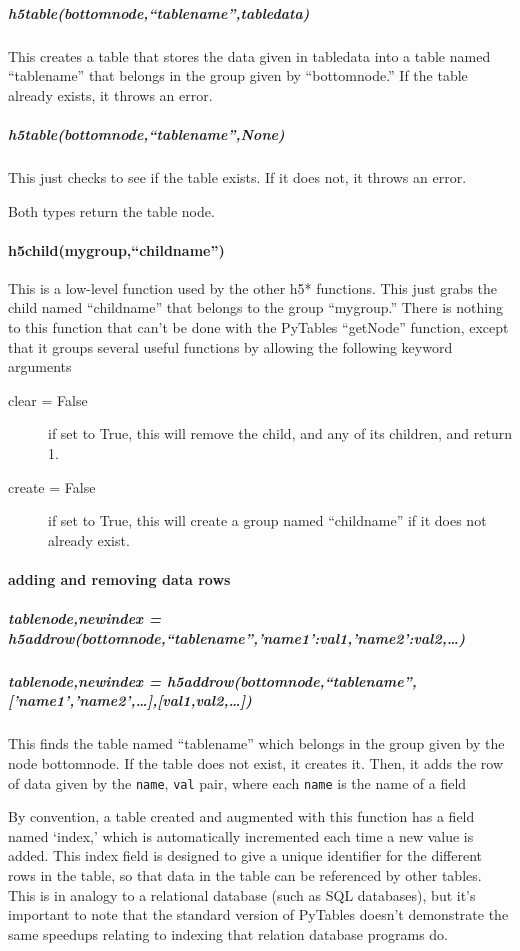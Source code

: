 \subparagraph{h5table(bottomnode,``tablename'',tabledata)}
This creates a table that stores the data given in tabledata
    into a table named ``tablename'' that belongs in the group given
    by ``bottomnode.''
If the table already exists, it throws an error.

\subparagraph{h5table(bottomnode,``tablename'',None)}
This just checks to see if the table exists.
If it does not, it throws an error.

Both types return the table node.

\paragraph{h5child(mygroup,``childname'')}
This is a low-level function used by the other h5* functions.
This just grabs the child named ``childname'' that belongs
    to the group ``mygroup.''
There is nothing to this function that can't be done with
    the PyTables ``getNode'' function,
    except that it groups several useful functions
    by allowing the following keyword arguments
    \begin{mykwargs}
        \begin{description}
            \item[clear = False] if set to True, this will remove
                the child, and any of its children, and return 1.
            \item[create = False] if set to True, this will create
                a group named ``childname'' if it does not already exist.
        \end{description}
    \end{mykwargs}
\paragraph{adding and removing data rows}
\subparagraph{tablenode,newindex = h5addrow(bottomnode,``tablename'',{'name1':val1,'name2':val2,\ldots})}
\subparagraph{tablenode,newindex = h5addrow(bottomnode,``tablename'',['name1','name2',\ldots],[val1,val2,\ldots])}
This finds the table named ``tablename'' which belongs
    in the group given by the node bottomnode.
If the table does not exist, it creates it.
Then, it adds the row of data given by
    the \texttt{name}, \texttt{val} pair,
    where each \texttt{name} is the name of a field

By convention, a table created and augmented with this function
    has a field named `index,' which is automatically incremented
    each time a new value is added.
This index field is designed to give a unique identifier for
    the different rows in the table, so that data in the table
    can be referenced by other tables.
This is in analogy to a relational database
    (such as SQL databases),
    but it's important to note that the standard version
    of PyTables doesn't demonstrate the same speedups
    relating to indexing that relation database programs do.

